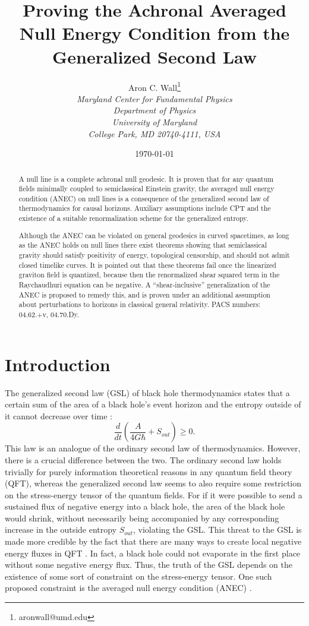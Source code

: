 \documentclass{article}
\author{Aron C. Wall\footnote{aronwall@umd.edu}
\\ \textit{Maryland Center for Fundamental Physics} \\ \textit{Department of Physics} \\ \textit{University of Maryland} \\ \textit{College Park, MD 20740-4111, USA} }
\title{Proving the Achronal Averaged Null Energy Condition from the Generalized Second Law}
\date{\today}
\begin{document}
\maketitle

\begin{abstract}
A null line is a complete achronal null geodesic.  It is proven that for any quantum fields minimally coupled to semiclassical Einstein gravity, the averaged null energy condition (ANEC) on null lines is a consequence of the generalized second law of thermodynamics for causal horizons.  Auxiliary assumptions include CPT and the existence of a suitable renormalization scheme for the generalized entropy.

Although the ANEC can be violated on general geodesics in curved spacetimes, as long  as the ANEC holds on null lines there exist theorems showing that semiclassical gravity should satisfy positivity of energy, topological censorship, and should not admit closed timelike curves.  It is pointed out that these theorems fail once the linearized graviton field is quantized, because then the renormalized shear squared term in the Raychaudhuri equation can be negative.  A ``shear-inclusive'' generalization of the ANEC is proposed to remedy this, and is proven under an additional assumption about perturbations to horizons in classical general relativity.
\newline\newline
PACS numbers: 04.62.+v, 04.70.Dy.
\end{abstract}

\newpage

\section{Introduction}\label{intro}

The generalized second law (GSL) of black hole thermodynamics states that a certain sum of the area of a black hole's event horizon and the entropy outside of it cannot decrease over time \cite{hawking75}:
\begin{equation}
\frac{d}{dt}(\frac{A}{4G\hbar} + S_{out}) \ge 0.
\end{equation}
This law is an analogue of the ordinary second law of thermodynamics.  However, there is a crucial difference between the two.  The ordinary second law holds trivially for purely information theoretical reasons in any quantum field theory (QFT), whereas the generalized second law seems to also require some restriction on the stress-energy tensor of the quantum fields.  For if it were possible to send a sustained flux of negative energy into a black hole, the area of the black hole would shrink, without necessarily being accompanied by any corresponding increase in the outside entropy $S_{out}$, violating the GSL.  This threat to the GSL is made more credible by the fact that there are many ways to create local negative energy fluxes in QFT \cite{BM69}.  In fact, a black hole could not evaporate in the first place without some negative energy flux.  Thus, the truth of the GSL depends on the existence of some sort of constraint on the stress-energy tensor.  One such proposed constraint is the averaged null energy condition (ANEC) \cite{borde87}\cite{roman88}.
\end{document}
